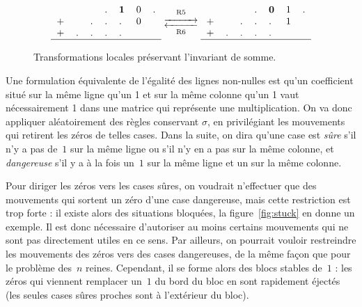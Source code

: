 \documentclass[11pt, openany, a4paper]{article}
\newcommand{\myrightleftarrows}[1]{\mathrel{\substack{\xrightarrow{#1} \\[-.6ex] \xleftarrow{#1}}}}
\newcommand{\longrightleftarrows}{\myrightleftarrows{\rule{1cm}{0cm}}}
\begin{document}
\begin{figure}[hbt]
{\begin{minipage}{0.6\textwidth}
\[
\begin{tabular}{lllllll}
&&&.&\textbf 1&0&. \\
+&&.&.&.&0&\\
+&.&.&.&.&&\\
\hline
\end{tabular}
\mathrel{\mathop{\longrightleftarrows}^{\mathrm{R5}}_{\mathrm{R6}}}
\begin{tabular}{lllllll}
&&&.&\textbf 0&1&. \\
+&&.&.&.&1&\\
+&.&.&.&.&&\\
\hline
\end{tabular}
\]
\end{minipage}}

\caption{Transformations locales préservant l'invariant de somme.}

\label{fig:rules}

\end{figure}




Une formulation équivalente de l'égalité des lignes non-nulles est qu'un coefficient situé sur la même ligne qu'un 1 et sur la même colonne qu'un 1 vaut nécessairement 1 dans une matrice qui représente une multiplication. On va donc appliquer aléatoirement des règles conservant $\sigma$, en privilégiant les mouvements qui retirent les zéros de telles cases. Dans la suite, on dira qu'une case est \emph{sûre} s'il n'y a pas de~$1$ sur la même ligne ou s'il n'y en a pas sur la même colonne, et \emph{dangereuse} s'il y a à la fois un~$1$ sur la même ligne et un sur la même colonne.

Pour diriger les zéros vers les cases sûres, on voudrait n'effectuer que des mouvements qui sortent un zéro d'une case dangereuse, mais cette restriction est trop forte : il existe alors des situations bloquées, la figure~\ref{fig:stuck} en donne un exemple. Il est donc nécessaire d'autoriser au moins certains mouvements qui ne sont pas directement utiles en ce sens. Par ailleurs, on pourrait vouloir restreindre les mouvements des zéros vers des cases dangereuses, de la même façon que pour le problème des~$n$ reines. Cependant, il se forme alors des blocs stables de~$1$ : les zéros qui viennent remplacer un~$1$ du bord du bloc en sont rapidement éjectés (les seules cases sûres proches sont à l'extérieur du bloc). 
\end{document}
